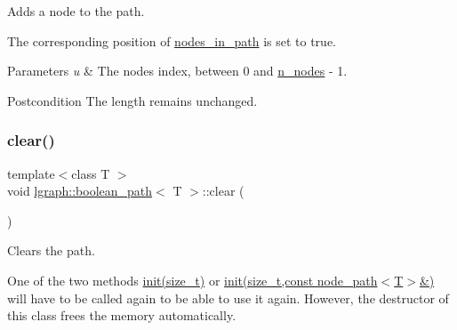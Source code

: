 Adds a node to the path. 

The corresponding position of \hyperlink{classlgraph_1_1boolean__path_a0ea5d4c5f7e445270bb5c0346ec7c150}{nodes\+\_\+in\+\_\+path} is set to true. 
\begin{DoxyParams}{Parameters}
{\em u} & The node\textquotesingle{}s index, between 0 and \hyperlink{classlgraph_1_1boolean__path_a98f07b983e0812fd283f16c3871793ef}{n\+\_\+nodes} -\/ 1. \\
\hline
\end{DoxyParams}
\begin{DoxyPostcond}{Postcondition}
The length remains unchanged. 
\end{DoxyPostcond}
\mbox{\label{classlgraph_1_1boolean__path_a60fab7da9a58d1933dc1db0d3004ca67}} 
\subsubsection{\texorpdfstring{clear()}{clear()}}
{\footnotesize\ttfamily template$<$class T $>$ \\
void \hyperlink{classlgraph_1_1boolean__path}{lgraph\+::boolean\+\_\+path}$<$ T $>$\+::clear (\begin{DoxyParamCaption}{ }\end{DoxyParamCaption})}



Clears the path. 

One of the two methods \hyperlink{classlgraph_1_1boolean__path_a3e8fde070fbf86b3e9c6d6d4bc3b4a07}{init(size\+\_\+t)} or \hyperlink{classlgraph_1_1boolean__path_a01a381ba89ec44c10b7e6da16343ceac}{init(size\+\_\+t,const node\+\_\+path$<$\+T$>$\&)} will have to be called again to be able to use it again. However, the destructor of this class frees the memory automatically. \mbox{\label{classlgraph_1_1boolean__path_ae6ceef567800784b5cb751de8c319d5a}} 
